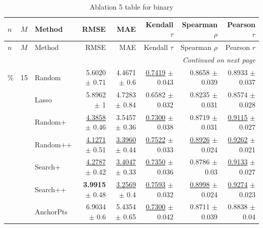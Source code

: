 \footnotesize
\setlength{\tabcolsep}{2pt}
\renewcommand{\arraystretch}{1.05}
\setlength{\LTpre}{0pt}
\setlength{\LTpost}{0pt}
\setlength{\LTleft}{\fill}
\setlength{\LTright}{\fill}
\begin{longtable}{llp{}rrrrr}
\caption{Ablation 5 table for binary}\label{tab:ablation\_5\_binary}\\
\toprule
$n$ & $M$ & Method & RMSE & MAE & Kendall $\tau$ & Spearman $\rho$ & Pearson $r$ \\
\midrule
\endfirsthead
\toprule
$n$ & $M$ & Method & RMSE & MAE & Kendall $\tau$ & Spearman $\rho$ & Pearson $r$ \\
\midrule
\endhead
\midrule
\multicolumn{8}{r}{\emph{Continued on next page}} \\
\midrule
\endfoot
\bottomrule
\endlastfoot
5\% & 15 & Random & 5.6020 {\scriptsize $\pm$ 0.71} & 4.4671 {\scriptsize $\pm$ 0.6} & \underline{0.7419} {\scriptsize $\pm$ 0.043} & 0.8658 {\scriptsize $\pm$ 0.039} & 0.8933 {\scriptsize $\pm$ 0.037} \\
 &  & Lasso & 5.8962 {\scriptsize $\pm$ 1} & 4.7283 {\scriptsize $\pm$ 0.84} & 0.6582 {\scriptsize $\pm$ 0.032} & 0.8235 {\scriptsize $\pm$ 0.031} & 0.8574 {\scriptsize $\pm$ 0.028} \\
 &  & Random+ & \underline{4.3858} {\scriptsize $\pm$ 0.46} & 3.5457 {\scriptsize $\pm$ 0.36} & \underline{0.7300} {\scriptsize $\pm$ 0.038} & 0.8719 {\scriptsize $\pm$ 0.031} & \underline{0.9115} {\scriptsize $\pm$ 0.027} \\
 &  & Random++ & \underline{4.1271} {\scriptsize $\pm$ 0.51} & \underline{3.3960} {\scriptsize $\pm$ 0.44} & \underline{0.7522} {\scriptsize $\pm$ 0.033} & \underline{0.8926} {\scriptsize $\pm$ 0.024} & \underline{0.9262} {\scriptsize $\pm$ 0.021} \\
 &  & Search+ & \underline{4.2787} {\scriptsize $\pm$ 0.42} & \underline{3.4047} {\scriptsize $\pm$ 0.33} & \underline{0.7350} {\scriptsize $\pm$ 0.036} & 0.8786 {\scriptsize $\pm$ 0.03} & \underline{0.9133} {\scriptsize $\pm$ 0.027} \\
 &  & Search++ & \textbf{3.9915} {\scriptsize $\pm$ 0.48} & \underline{3.2569} {\scriptsize $\pm$ 0.4} & \underline{0.7593} {\scriptsize $\pm$ 0.032} & \underline{0.8998} {\scriptsize $\pm$ 0.024} & \underline{0.9274} {\scriptsize $\pm$ 0.023} \\
 &  & AnchorPts & 6.9034 {\scriptsize $\pm$ 0.6} & 5.4354 {\scriptsize $\pm$ 0.65} & \underline{0.7300} {\scriptsize $\pm$ 0.042} & 0.8711 {\scriptsize $\pm$ 0.039} & 0.8838 {\scriptsize $\pm$ 0.04} \\

\end{longtable}
